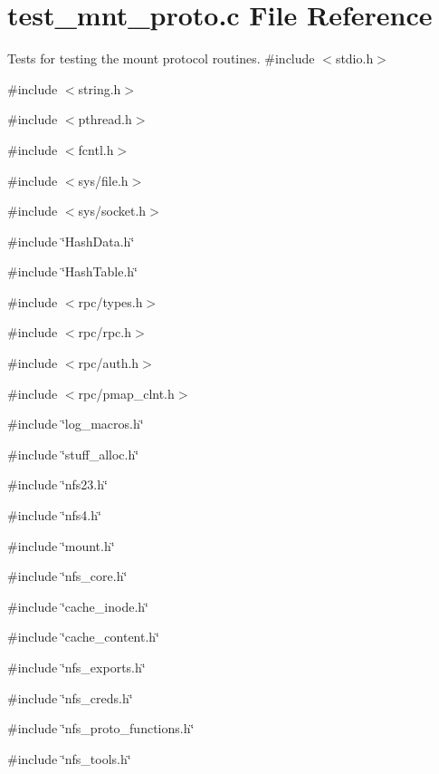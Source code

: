 \section{test\_\-mnt\_\-proto.c File Reference}
\label{test__mnt__proto_8c}


Tests for testing the mount protocol routines.  
{\ttfamily \#include $<$stdio.h$>$}\par
{\ttfamily \#include $<$string.h$>$}\par
{\ttfamily \#include $<$pthread.h$>$}\par
{\ttfamily \#include $<$fcntl.h$>$}\par
{\ttfamily \#include $<$sys/file.h$>$}\par
{\ttfamily \#include $<$sys/socket.h$>$}\par
{\ttfamily \#include \char`\"{}HashData.h\char`\"{}}\par
{\ttfamily \#include \char`\"{}HashTable.h\char`\"{}}\par
{\ttfamily \#include $<$rpc/types.h$>$}\par
{\ttfamily \#include $<$rpc/rpc.h$>$}\par
{\ttfamily \#include $<$rpc/auth.h$>$}\par
{\ttfamily \#include $<$rpc/pmap\_\-clnt.h$>$}\par
{\ttfamily \#include \char`\"{}log\_\-macros.h\char`\"{}}\par
{\ttfamily \#include \char`\"{}stuff\_\-alloc.h\char`\"{}}\par
{\ttfamily \#include \char`\"{}nfs23.h\char`\"{}}\par
{\ttfamily \#include \char`\"{}nfs4.h\char`\"{}}\par
{\ttfamily \#include \char`\"{}mount.h\char`\"{}}\par
{\ttfamily \#include \char`\"{}nfs\_\-core.h\char`\"{}}\par
{\ttfamily \#include \char`\"{}cache\_\-inode.h\char`\"{}}\par
{\ttfamily \#include \char`\"{}cache\_\-content.h\char`\"{}}\par
{\ttfamily \#include \char`\"{}nfs\_\-exports.h\char`\"{}}\par
{\ttfamily \#include \char`\"{}nfs\_\-creds.h\char`\"{}}\par
{\ttfamily \#include \char`\"{}nfs\_\-proto\_\-functions.h\char`\"{}}\par
{\ttfamily \#include \char`\"{}nfs\_\-tools.h\char`\"{}}\par
